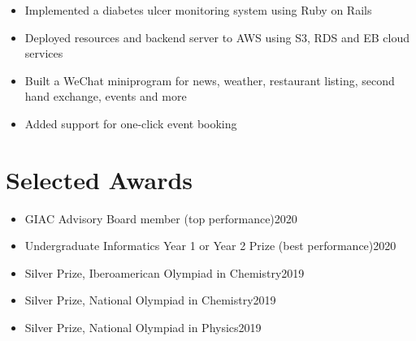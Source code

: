 \documentclass{resume}
\begin{document}
\begin{itemize}
  \item Implemented a diabetes ulcer monitoring system using Ruby on Rails
  \item Deployed resources and backend server to AWS using S3, RDS and EB cloud services
\end{itemize}

\begin{itemize}
    \item Built a WeChat miniprogram for news, weather, restaurant listing, second hand exchange, events and more
    \item Added support for one-click event booking
\end{itemize}



\section{Selected Awards}
\begin{itemize}
    \item GIAC Advisory Board member (top performance)\hfill 2020
    \item Undergraduate Informatics Year 1 or Year 2 Prize (best performance)\hfill 2020
    \item Silver Prize, Iberoamerican Olympiad in Chemistry\hfill 2019
    \item Silver Prize, National Olympiad in Chemistry\hfill 2019
    \item Silver Prize, National Olympiad in Physics\hfill 2019
\end{itemize}
\end{document}
